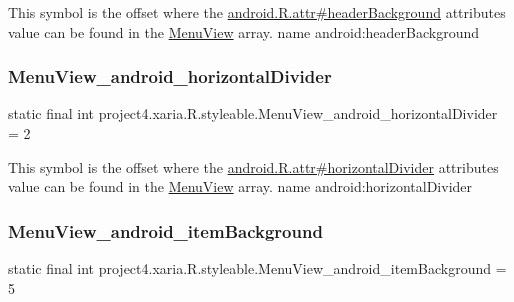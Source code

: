This symbol is the offset where the \hyperlink{}{android.\+R.\+attr\#header\+Background} attribute\textquotesingle{}s value can be found in the \hyperlink{classproject4_1_1xaria_1_1R_1_1styleable_ac1aef922f3c93d63048c893762b0dbda}{Menu\+View} array.  name android\+:header\+Background \mbox{\label{classproject4_1_1xaria_1_1R_1_1styleable_ac8dce77f204832af3ea731716ca38877}} 
\subsubsection{\texorpdfstring{Menu\+View\+\_\+android\+\_\+horizontal\+Divider}{MenuView\_android\_horizontalDivider}}
{\footnotesize\ttfamily static final int project4.\+xaria.\+R.\+styleable.\+Menu\+View\+\_\+android\+\_\+horizontal\+Divider = 2\hspace{0.3cm}{\ttfamily [static]}}

This symbol is the offset where the \hyperlink{}{android.\+R.\+attr\#horizontal\+Divider} attribute\textquotesingle{}s value can be found in the \hyperlink{classproject4_1_1xaria_1_1R_1_1styleable_ac1aef922f3c93d63048c893762b0dbda}{Menu\+View} array.  name android\+:horizontal\+Divider \mbox{\label{classproject4_1_1xaria_1_1R_1_1styleable_a2571658608ce1d5d8a959d3f06dc952d}} 
\subsubsection{\texorpdfstring{Menu\+View\+\_\+android\+\_\+item\+Background}{MenuView\_android\_itemBackground}}
{\footnotesize\ttfamily static final int project4.\+xaria.\+R.\+styleable.\+Menu\+View\+\_\+android\+\_\+item\+Background = 5\hspace{0.3cm}{\ttfamily [static]}}

